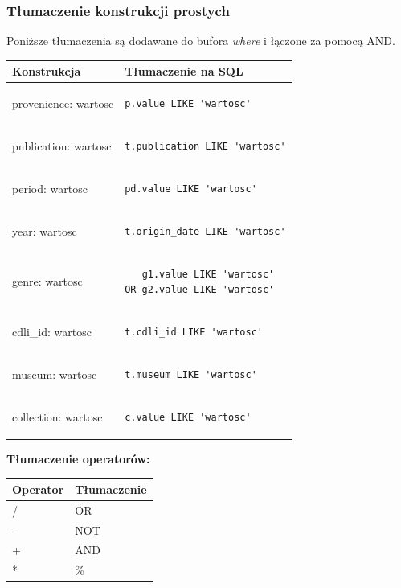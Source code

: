 \documentclass{pracamgr}
\begin{document}
\subsubsection{Tłumaczenie konstrukcji prostych}
Poniższe tłumaczenia są dodawane do bufora \textit{where} i łączone za pomocą AND.
\begin{longtable}{|p{3in}|p{3in}|}
\hline
{\bf Konstrukcja} & {\bf Tłumaczenie na SQL}\\
\hline
\endhead
provenience: wartosc & \begin{verbatim}p.value LIKE 'wartosc'\end{verbatim}
\\
\hline
publication: wartosc & 
\begin{verbatim}
t.publication LIKE 'wartosc'
\end{verbatim}
\\
\hline
period: wartosc & 
\begin{verbatim}
pd.value LIKE 'wartosc'
\end{verbatim}
\\
\hline
year: wartosc & 
\begin{verbatim}
t.origin_date LIKE 'wartosc'
\end{verbatim}
\\
\hline
genre: wartosc & 
\begin{verbatim}
   g1.value LIKE 'wartosc' 
OR g2.value LIKE 'wartosc'
\end{verbatim}
\\
\hline
cdli\_id: wartosc & 
\begin{verbatim}
t.cdli_id LIKE 'wartosc'
\end{verbatim}
\\
\hline
museum: wartosc & 
\begin{verbatim}
t.museum LIKE 'wartosc'
\end{verbatim}
\\
\hline
collection: wartosc & 
\begin{verbatim}
c.value LIKE 'wartosc'
\end{verbatim}
\\
\hline
\end{longtable}

\textbf{Tłumaczenie operatorów:}
\begin{longtable}{|p{1in}|p{1in}|}
\hline
{\bf Operator} & {\bf Tłumaczenie}\\
\hline
\endhead
/ & OR\\ 
\hline
-- & NOT\\ 
\hline
+ & AND\\ 
\hline
* & \%  \\ 
\hline
\end{longtable}
\end{document}
